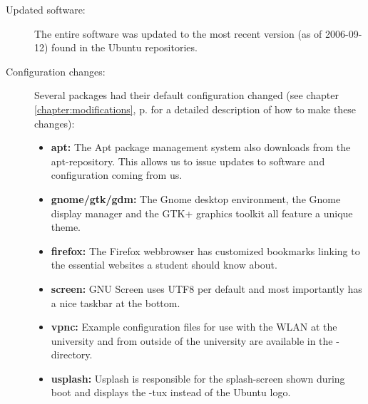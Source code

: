 \begin{description}
\begin{itemize}
     \end{itemize}
   \item[Updated software:] The entire software was updated to the most recent
     version (as of 2006-09-12) found in the Ubuntu repositories. 
   \item[Configuration changes:] Several packages had their default
     configuration changed (see chapter \ref{chapter:modifications}, p. 
     	\pageref{chapter:modifications} for a detailed description of how to make
	these changes):
     \begin{itemize}
       \item \textbf{apt:} The Apt package management system also downloads from
         the \tunix{} apt-repository. This allows us to issue updates to software
	 and configuration coming from us.
       \item \textbf{gnome/gtk/gdm:} The Gnome desktop environment, the Gnome
         display manager and the GTK+ graphics toolkit all feature a unique
	 theme.
       \item \textbf{firefox:} The Firefox webbrowser has customized bookmarks
         linking to the essential websites a student should know about.
       \item \textbf{screen:} GNU Screen uses UTF8 per default and most
         importantly has a nice taskbar at the bottom.
       \item \textbf{vpnc:} Example configuration files for use with the WLAN at
         the university and from outside of the university are available in the
	 -directory.
       \item \textbf{usplash:} Usplash is responsible for the splash-screen
         shown during boot and displays the \tunix-tux instead of the Ubuntu
	 logo.
     \end{itemize}
\end{description}
